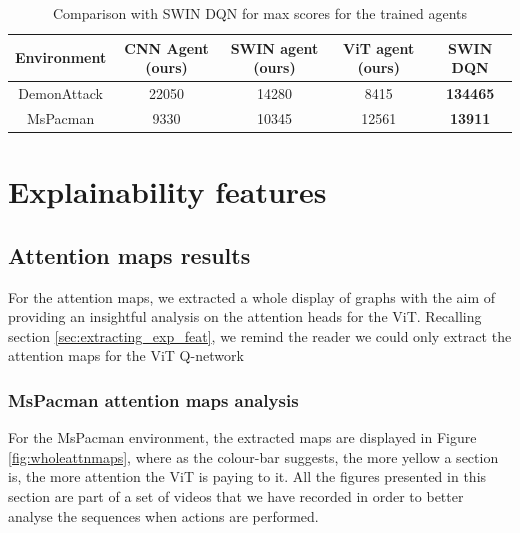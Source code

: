 \begin{table}[!h]
	\begin{center}
		\caption[Comparison with SWIN DQN \cite{meng2024deep} for max scores for the trained agents]{Comparison with SWIN DQN \cite{meng2024deep} for max scores for the trained agents}
		\label{tab:sota_max_final_results}
		\begin{tabular}{||c c c c c||} 
			\hline
			Environment& CNN Agent (ours) & SWIN agent (ours) & ViT agent (ours) & SWIN DQN  \\ [0.5ex] 
			\hline\hline
			DemonAttack& 22050 & 14280 & 8415 & \textbf{134465}\\ 
			\hline
			MsPacman & 9330 &  10345 & 12561 & \textbf{13911}  \\
			\hline
		\end{tabular}
	\end{center}
\end{table}

\section{Explainability features}
\label{sec:eval_feat_explainability}

\subsection{Attention maps results}
\label{sec:eval_attn_maps_explainability}
For the attention maps, we extracted a whole display of graphs with the aim of providing an insightful analysis on the attention heads for the ViT. Recalling section \ref{sec:extracting_exp_feat}, we remind the reader we could only extract the attention maps for the ViT Q-network

\subsubsection{MsPacman attention maps analysis}
For the MsPacman environment, the extracted maps are displayed in Figure \ref{fig:wholeattnmaps}, where as the colour-bar suggests, the more yellow a section is, the more attention the ViT is paying to it. All the figures presented in this section are part of a set of videos that we have recorded in order to better analyse the sequences when actions are performed. 

